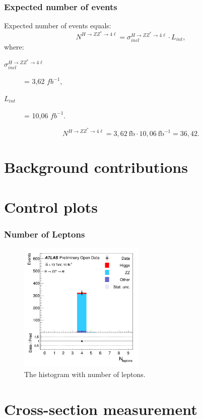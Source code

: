\documentclass[aspectratio=1610, english]{beamer}
\newcommand{\hzz}{ H\rightarrow ZZ^{*}\rightarrow 4 \ell}
\begin{document}
\begin{frame}
\frametitle{Expected number of events}
Expected number of events equals:
\begin{equation}
N^{ \hzz }=\sigma^{ \hzz }_{incl} \cdot L_{int},
\end{equation}
where:
\begin{description}
\item[$\sigma^{ \hzz }_{incl}$] = 3,62 $fb^{-1}$,
\item[$L_{int}$] = 10,06 $fb^{-1}$.
\end{description}
\vspace{1cm}
\begin{equation}
N^{ \hzz }=3,62 \: \mathrm{fb} \cdot 10,06 \: \mathrm{fb}^{-1} = 36,42.
\end{equation}

\end{frame}

\section{Background contributions}

\section{Control plots}

\begin{frame}
\frametitle{Number of Leptons}

\begin{figure} [H]
\centering
\includegraphics[width=6cm]{hist_n_leptons.png}
\caption{The histogram with number of leptons. }
\end{figure}

\end{frame}

\section{Cross-section measurement}
\end{document}
